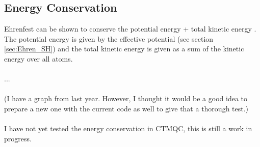 \subsection{Energy Conservation}
Ehrenfest can be shown to conserve the potential energy + total kinetic energy \cite{john_c._tully_nonadiabatic_1998}. The potential energy is given by the effective potential (see section \ref{sec:Ehren_SH}) and the total kinetic energy is given as a sum of the kinetic energy over all atoms.
\\\\
...
\\\\
(I have a graph from last year. However, I thought it would be a good idea to prepare a new one with the current code as well to give that a thorough test.)
\\\\
I have not yet tested the energy conservation in CTMQC, this is still a work in progress.

